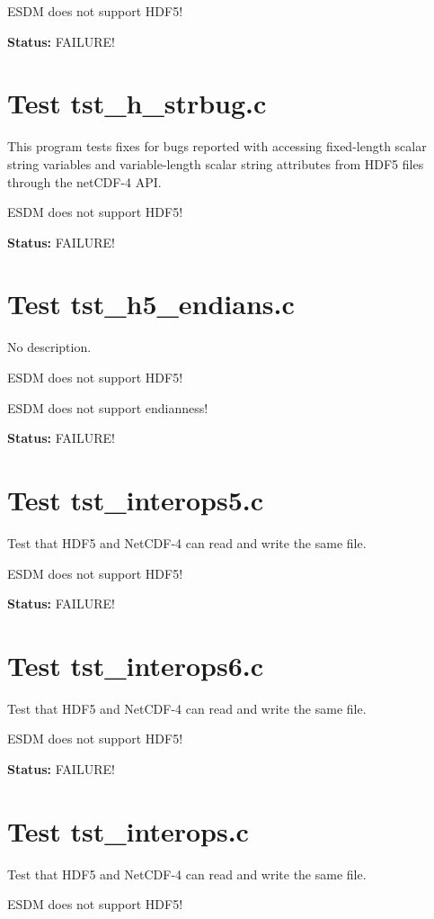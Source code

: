 ESDM does not support HDF5!

{\bf \large Status: } FAILURE!

\section{Test tst\_h\_strbug.c}

This program tests fixes for bugs reported with accessing fixed-length scalar string variables and variable-length scalar string attributes from HDF5 files through the netCDF-4 API.

ESDM does not support HDF5!

{\bf \large Status: } FAILURE!

\section{Test tst\_h5\_endians.c}

No description.

ESDM does not support HDF5!

ESDM does not support endianness!

{\bf \large Status: } FAILURE!

\section{Test tst\_interops5.c}

Test that HDF5 and NetCDF-4 can read and write the same file.

ESDM does not support HDF5!

{\bf \large Status: } FAILURE!

\section{Test tst\_interops6.c}

Test that HDF5 and NetCDF-4 can read and write the same file.

ESDM does not support HDF5!

{\bf \large Status: } FAILURE!

\section{Test tst\_interops.c}

Test that HDF5 and NetCDF-4 can read and write the same file.

ESDM does not support HDF5!

